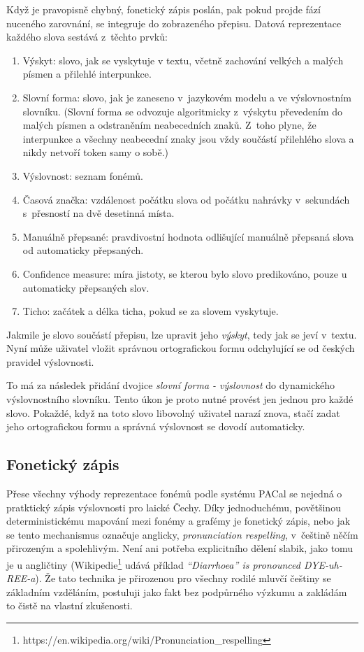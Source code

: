 Když je pravopisně chybný, fonetický zápis poslán, pak pokud projde fází
nuceného zarovnání, se integruje do zobrazeného přepisu. Datová reprezentace
každého slova sestává z~těchto prvků:
\begin{enumerate}
\item{Výskyt:
    slovo, jak se vyskytuje v textu, včetně zachování velkých a malých písmen a
    přilehlé interpunkce.
}
\item{Slovní forma:
    slovo, jak je zaneseno v~jazykovém modelu a ve výslovnostním slovníku.
    (Slovní forma se odvozuje algoritmicky z~výskytu převedením do malých písmen
    a odstraněním neabecedních znaků. Z~toho plyne, že interpunkce a všechny
    neabecední znaky jsou vždy součástí přilehlého slova a nikdy netvoří token
    samy o sobě.)
}
\item{Výslovnost:
    seznam fonémů.
}
\item{Časová značka:
    vzdálenost počátku slova od počátku nahrávky v~sekundách s~přesností na dvě
    desetinná místa.
}
\item{Manuálně přepsané:
    pravdivostní hodnota odlišující manuálně přepsaná slova od automaticky
    přepsaných.
}
\item{Confidence measure:
    míra jistoty, se kterou bylo slovo predikováno, pouze u automaticky
    přepsaných slov.
}
\item{Ticho:
    začátek a délka ticha, pokud se za slovem vyskytuje.
}
\end{enumerate}
Jakmile je slovo součástí přepisu, lze upravit jeho {\em výskyt}, tedy jak se
jeví v~textu. Nyní může uživatel vložit správnou ortografickou formu odchylující
se od českých pravidel výslovnosti.

To má za následek přidání dvojice {\em slovní forma - výslovnost} do dynamického
výslovnostního slovníku. Tento úkon je proto nutné provést jen jednou pro každé
slovo. Pokaždé, když na toto slovo libovolný uživatel narazí znova, stačí zadat jeho
ortografickou formu a správná výslovnost se dovodí automaticky.

\subsection{Fonetický zápis}

Přese všechny výhody reprezentace fonémů podle systému PACal se nejedná o
pratktický zápis výslovnosti pro laické Čechy. Díky jednoduchému, povětšinou
deterministickému mapování mezi fonémy a grafémy je fonetický zápis, nebo jak
se tento mechanismus označuje anglicky, {\em pronunciation respelling},
v~češtině něčím přirozeným a spolehlivým. Není ani potřeba explicitního dělení
slabik, jako tomu je u angličtiny
(Wikipedie\footnote{https://en.wikipedia.org/wiki/Pronunciation\_respelling}
udává příklad {\em ``Diarrhoea'' is pronounced DYE-uh-REE-a}).
Že tato technika je přirozenou pro všechny rodilé mluvčí češtiny se základním vzděláním,
postuluji jako fakt bez podpůrného výzkumu a zakládám to čistě na vlastní
zkušenosti.

